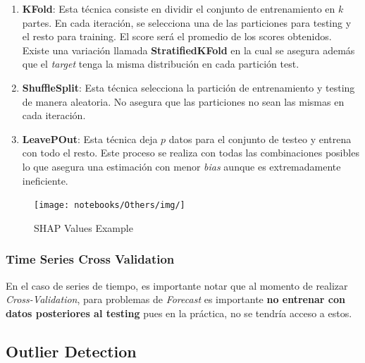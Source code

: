 \begin{enumerate}
    \item \textbf{KFold}: Esta técnica consiste en dividir el conjunto de entrenamiento en $k$ partes. En cada iteración, se selecciona una de las particiones para testing y el resto para training. El score será el promedio de los scores obtenidos. Existe una variación llamada \textbf{StratifiedKFold} en la cual se asegura además que el \textit{target} tenga la misma distribución en cada partición test. 
    \item \textbf{ShuffleSplit}: Esta técnica selecciona la partición de entrenamiento y testing de manera aleatoria. No asegura que las particiones no sean las mismas en cada iteración. 
    \item \textbf{LeavePOut}: Esta técnica deja $p$ datos para el conjunto de testeo y entrena con todo el resto. Este proceso se realiza con todas las combinaciones posibles lo que asegura una estimación con menor \textit{bias} aunque es extremadamente ineficiente. 
\end{enumerate}

\begin{figure}[H]
    \center
    \texttt{[image: notebooks/Others/img/]}
    \caption{SHAP Values Example}
\end{figure}

\subsubsection{Time Series Cross Validation}

En el caso de series de tiempo, es importante notar que al momento de realizar \textit{Cross-Validation}, para problemas de \textit{Forecast} es importante \textbf{no entrenar con datos posteriores al testing} pues en la práctica, no se tendría acceso a estos.



\subsection{Outlier Detection}







